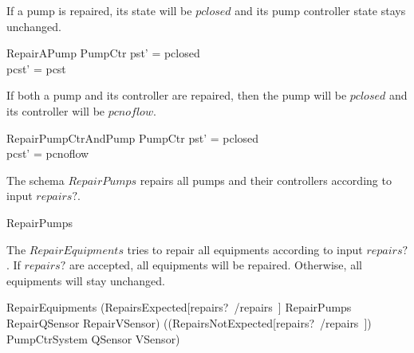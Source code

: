 \documentclass{report} %
\begin{document}
If a pump is repaired, its state will be $pclosed$ and its pump controller state stays unchanged.
\begin{schema}{RepairAPump}
  \Delta PumpCtr
  \where
  pst' = pclosed \\ %
  pcst' = pcst
\end{schema}

If both a pump and its controller are repaired, then the pump will be $pclosed$ and its controller will be $pcnoflow$.
\begin{schema}{RepairPumpCtrAndPump}
  \Delta PumpCtr
  \where
  pst' = pclosed \\
  pcst' = pcnoflow
\end{schema}

The schema $RepairPumps$ repairs all pumps and their controllers according to input $repairs?$.
\begin{zed}
RepairPumps 
\end{zed}

The $RepairEquipments$ tries to repair all equipments according to input $repairs?$. If $repairs?$ are accepted, all equipments will be repaired. Otherwise, all equipments will stay unchanged.
\begin{zed}
    RepairEquipments  (RepairsExpected[repairs?~/repairs~] \land RepairPumps \land RepairQSensor \land RepairVSensor) \lor ((RepairsNotExpected[repairs?~/repairs~]) \land \Xi PumpCtrSystem \land \Xi QSensor \land \Xi VSensor)
\end{zed}
\end{document}
